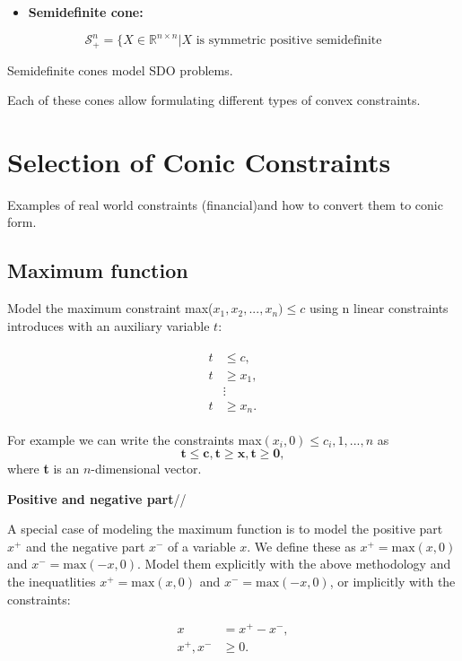 \documentclass{article}
\begin{document}
\begin{itemize}
\item{\textbf{Semidefinite cone:}}
\end{itemize}

$$\mathcal{S}^n_+=\{X \in \mathbb{R}^{n\times n}| X\text{ is symmetric positive semidefinite}$$

Semidefinite cones model SDO problems.

Each of these cones allow formulating different types of convex constraints.

\section{Selection of Conic Constraints}

Examples of real world constraints (financial)and how to convert them to conic form.

\subsection{Maximum function}

Model the maximum constraint max($x_1, x_2, ... , x_n)\leq c$ using n linear constraints introduces with an auxiliary variable $t$:

\begin{align}
  \begin{split}
    t &\leq c, \\
    t &\geq x_1, \\
    &\vdots \\
    t &\geq x_n.
  \end{split}
\end{align}

For example we can write the constraints max$(x_i,0)\leq c_i, 1,...,n$ as
$$\mathbf{t} \leq \mathbf{c}, \mathbf{t}\geq \mathbf{x}, \mathbf{t}\geq \mathbf{0},$$
where \textbf{t} is an $n$-dimensional vector.

\textbf{Positive and negative part}//

A special case of modeling the maximum function is to model the positive part $x^+$ and the negative part $x^-$ of a variable $x$.
We define these as $x^+=\text{max}(x,0)$ and $x^-=\text{max}(-x,0)$. Model them explicitly with the above methodology and
the inequatlities $x^+=\text{max}(x,0)$ and $x^-=\text{max}(-x,0)$, or implicitly with the constraints:

\begin{align}
  x &= x^+ - x^-, \\
  x^+, x^- &\geq 0.
\end{align}
\end{document}
